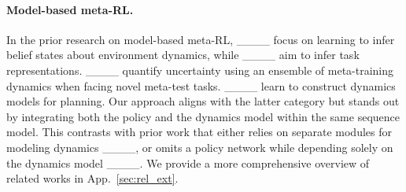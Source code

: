 \paragraph*{Model-based meta-RL.}
In the prior research on model-based meta-RL, 
____ focus on learning to infer belief states about environment dynamics, while ____ aim to infer task representations.
____ quantify uncertainty using an ensemble of meta-training dynamics when facing novel meta-test tasks.
____ learn to construct dynamics models for planning.
Our approach aligns with the latter category but stands out by integrating both the policy and the dynamics model within the same sequence model.
This contrasts with prior work that either relies on separate modules for modeling dynamics ____, or omits a policy network while depending solely on the dynamics model ____.
We provide a more comprehensive overview of related works in App.~\ref{sec:rel_ext}.